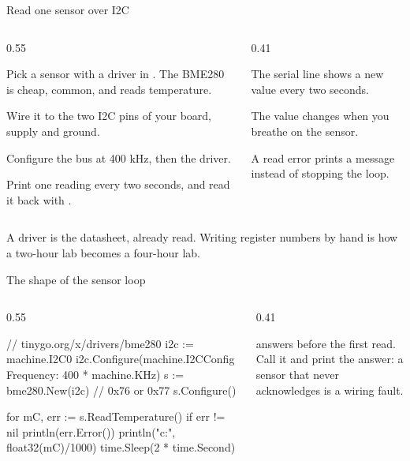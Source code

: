 \documentclass[10pt,aspectratio=169,t]{beamer}
\begin{document}
\begin{frame}[embedded,eyebrow=Task I]{Read one sensor over I2C}
  \begin{columns}[T]
    \begin{column}{0.55\textwidth}
      \begin{steps}
        \item Pick a sensor with a driver in . The BME280 is cheap, common, and reads temperature.
        \item Wire it to the two I2C pins of your board, supply and ground.
        \item Configure the bus at 400 kHz, then the driver.
        \item Print one reading every two seconds, and read it back with .
      \end{steps}
    \end{column}
    \begin{column}{0.41\textwidth}
      \begin{checklist}
        \item The serial line shows a new value every two seconds.
        \item The value changes when you breathe on the sensor.
        \item A read error prints a message instead of stopping the loop.
      \end{checklist}
    \end{column}
  \end{columns}
  \begin{takeaway}{A driver is the datasheet, already read.}
    Writing register numbers by hand is how a two-hour lab becomes a four-hour lab.
  \end{takeaway}
\end{frame}

\begin{frame}[embedded,fragile,eyebrow=Task I]{The shape of the sensor loop}
  \begin{columns}[T]
    \begin{column}{0.55\textwidth}
\begin{golang}
// tinygo.org/x/drivers/bme280
i2c := machine.I2C0
i2c.Configure(machine.I2CConfig{
    Frequency: 400 * machine.KHz})
s := bme280.New(i2c)  // 0x76 or 0x77
s.Configure()

for {
    mC, err := s.ReadTemperature()
    if err != nil { println(err.Error()) }
    println("c:", float32(mC)/1000)
    time.Sleep(2 * time.Second)
}
\end{golang}
    \end{column}
    \begin{column}{0.41\textwidth}
      \begin{warning}
         answers before the first read. Call it and print the answer: a sensor that never acknowledges is a wiring fault.
      \end{warning}
    \end{column}
  \end{columns}
\end{frame}
\end{document}
